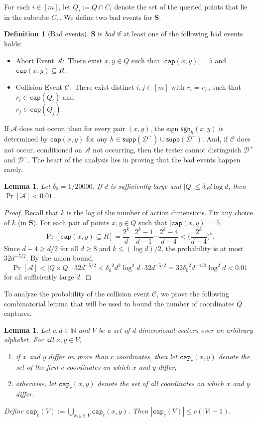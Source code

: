 \documentclass[11pt]{article}
\numberwithin{equation}{section}
\newtheorem{lemma}[theorem]{Lemma}
\theoremstyle{definition}
\newtheorem{definition}[theorem]{Definition}
\theoremstyle{plain}
\newcommand{\bS}{\ensuremath{\mathbf{S}}}
\newcommand{\cA}{\ensuremath{\mathcal{A}}}
\newcommand{\cC}{\ensuremath{\mathcal{C}}}
\newcommand{\Yes}{\ensuremath{\mathcal{D}^+}}
\newcommand{\No}{\ensuremath{\mathcal{D}^-}}
\newcommand{\lbconst}{\ensuremath{\delta_0}}
\newcommand{\capt}{\mathtt{cap}}
\newcommand{\sgn}{\mathsf{sgn}}
\newcommand{\supp}{\mathsf{supp}}
\begin{document}
For each $i \in [m]$, let $Q_i := Q \cap C_i$ denote the set of the queried points that lie in the subcube $C_i$\,. %
We define two bad events for $\bS$.
\begin{definition}[Bad events]\label{def:bad}
$\bS$ is \emph{bad} if at least one of the following bad events holds:
\begin{itemize}
\item Abort Event $\cA$:\ There exist $x,y \in Q$
such that $|\capt(x,y)| = 5$ and $\capt(x,y) \subseteq R$.
\item Collision Event $\cC$:\ There exist distinct $i,j \in [m]$
with $r_i = r_j$\,, %
such that $r_i\in \capt(Q_i)$ and \\ $r_j\in \capt(Q_j)$.
%
\end{itemize}
\end{definition}

If $\cA$ does not occur, then
for every pair $(x,y)$, the sign $\sgn_h(x,y)$ is determined by $\capt(x,y)$ for any $h\in \supp(\Yes)\cup \supp(\No)$.
And, if $\cC$ does not occur, conditioned on $\cA$ not occurring, then the tester cannot distinguish $\Yes$ and $\No.$
The heart of the analysis lies in proving that the bad events happen rarely.
%
%
%
%
%
%

\begin{lemma}\label{lem:abort}
Let $\lbconst = {1}/{20000}$. If $d$ is sufficiently large and $|Q|\leq \lbconst d\log d$, then $\Pr[\cA] < 0.01$\,. %
\end{lemma}

\begin{proof}
Recall that $k$ is the log of the number of action dimensions.
Fix any choice of $k$ (in $\bS$).
For each pair of points $x,y \in Q$ such that $|\capt(x,y)| = 5$,
\[\Pr[\capt(x,y) \subseteq R] = \frac{2^k}{d} \cdot \frac{2^k-1}{d-1} \cdots \frac{2^k-4}{d-4} < \Big(\frac{2^k}{d-4}\Big)^5.\]
Since $d-4 \geq d/2$ for all $d \geq 8$
and $k \leq (\log d)/2$, the probability is at most $32d^{-5/2}$.
By the union bound, $$\Pr[\cA] < |Q \times Q| \cdot 32d^{-5/2} < \lbconst^2 d^2 \log^2 d \cdot 32 d^{-5/2}  = 32 \lbconst^2 d^{-1/2} \log^2 d < 0.01$$ for all sufficiently large $d$.
\end{proof}

To analyze the probability of the collision event $\cC$, we prove the following combinatorial lemma that will be used to bound the number of coordinates $Q$ captures.

\begin{lemma}\label{lem:comb}
Let $c,d \in \mathbb{N}$ and $V$ be a set of $d$-dimensional vectors over an arbitrary alphabet. For all $x,y \in V$,
\begin{enumerate}
\item  if $x$ and $y$ differ on more than $c$ coordinates, then let $\capt_c(x,y)$ denote the set of the first $c$ coordinates on which $x$ and $y$ differ;
\item otherwise, let $\capt_c(x,y)$ denote the set of all coordinates
on which $x$ and $y$ differ.
\end{enumerate}
Define $\capt_c(V) := \bigcup_{x,y \in V} \capt_c(x,y)$.
Then $|\capt_c(V)| \leq c(|V|-1)$.
\end{lemma}
\end{document}
